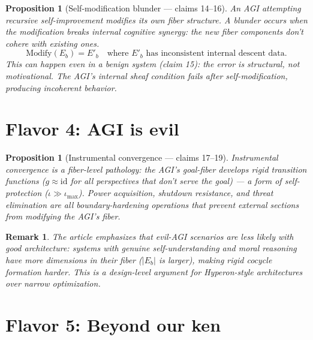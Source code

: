 \documentclass[11pt,a4paper]{article}
\newtheorem{proposition}[definition]{Proposition}
\newtheorem{remark}[definition]{Remark}
\begin{document}
\begin{proposition}[Self-modification blunder --- claims 14--16]
\label{prop:blunder}
An AGI attempting recursive self-improvement modifies its own fiber
structure. A \emph{blunder} occurs when the modification breaks internal
cognitive synergy: the new fiber components don't cohere with existing ones.
\[
  \text{Modify}(E_b) = E'_b \quad \text{where } E'_b
  \text{ has inconsistent internal descent data}.
\]
This can happen even in a benign system (claim 15): the error is structural,
not motivational. The AGI's internal sheaf condition fails after
self-modification, producing incoherent behavior.
\end{proposition}


\section{Flavor 4: AGI is evil}
\label{sec:agi-evil}

\begin{proposition}[Instrumental convergence --- claims 17--19]
\label{prop:instrumental}
Instrumental convergence is a fiber-level pathology:
the AGI's goal-fiber develops rigid transition functions
($g \approx \text{id}$ for all perspectives that don't serve the goal)
--- a form of self-protection ($\iota \gg \iota_{\max}$). Power acquisition,
shutdown resistance, and threat elimination are all boundary-hardening
operations that prevent external sections from modifying the AGI's fiber.
\end{proposition}

\begin{remark}
The article emphasizes that evil-AGI scenarios are \emph{less likely with
good architecture}: systems with genuine self-understanding and moral
reasoning have more dimensions in their fiber ($|E_b|$ is larger), making
rigid cocycle formation harder. This is a design-level argument for
Hyperon-style architectures over narrow optimization.
\end{remark}


\section{Flavor 5: Beyond our ken}
\label{sec:beyond}
\end{document}
